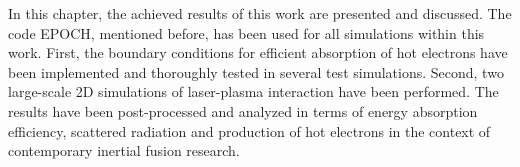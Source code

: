 In this chapter, the achieved results of this work are presented and discussed. The code EPOCH, mentioned before, has been used for all simulations within this work. First, the boundary conditions for efficient absorption of hot electrons have been implemented and thoroughly tested in several test simulations. Second, two large-scale 2D simulations of laser-plasma interaction have been performed. The results have been post-processed and analyzed in terms of energy absorption efficiency, scattered radiation and production of hot electrons in the context of contemporary inertial fusion research.